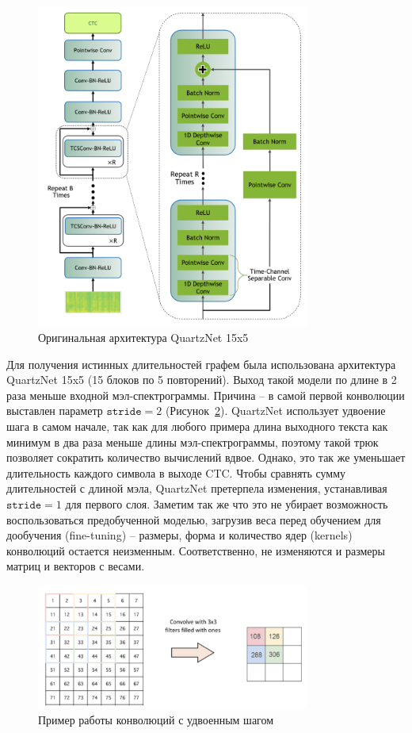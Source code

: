 \begin{figure}[!ht]
\centering
\includegraphics[width=0.8\textwidth]{images/qn.png}
\caption{Оригинальная архитектура QuartzNet 15x5}
\label{fig:qn}
\end{figure}

Для получения истинных длительностей графем была использована архитектура QuartzNet 15x5 (15 блоков по 5 повторений). Выход такой модели по длине в 2 раза меньше входной мэл-спектрограммы. Причина -- в самой первой конволюции выставлен параметр $\texttt{stride}=2$ (Рисунок~\ref{fig:stride-2}). QuartzNet использует удвоение шага в самом начале, так как для любого примера длина выходного текста как минимум в два раза меньше длины мэл-спектрограммы, поэтому такой трюк позволяет сократить количество вычислений вдвое. Однако, это так же уменьшает длительность каждого символа в выходе CTC. Чтобы сравнять сумму длительностей с длиной мэла, QuartzNet претерпела изменения, устанавливая $\texttt{stride}=1$ для первого слоя. Заметим так же что это не убирает возможность воспользоваться предобученной моделью, загрузив веса перед обучением для дообучения (fine-tuning) -- размеры, форма и количество ядер (kernels) конволюций остается неизменным. Соответственно, не изменяются и размеры матриц и векторов с весами.

\begin{figure}[!ht]
\centering
\includegraphics[width=0.8\textwidth]{images/snippets/stride-2.png}
\caption{Пример работы конволюций с удвоенным шагом}
\label{fig:stride-2}
\end{figure}


